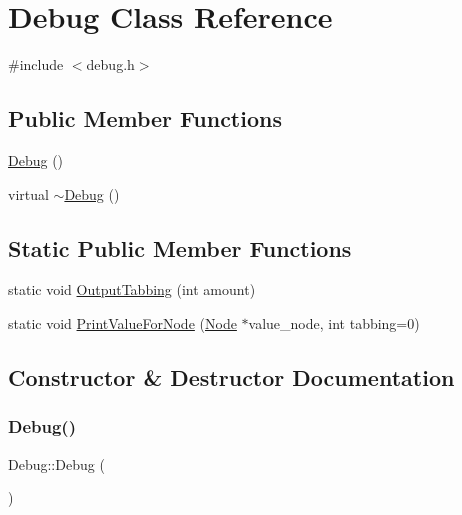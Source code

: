 \hypertarget{classDebug}{}\section{Debug Class Reference}
\label{classDebug}


{\ttfamily \#include $<$debug.\+h$>$}

\subsection*{Public Member Functions}
\begin{DoxyCompactItemize}
\item 
\hyperlink{classDebug_a5b453c195c4cfffed2702c3330f53a64}{Debug} ()
\item 
virtual \hyperlink{classDebug_a1effbd1502e249f80a3122b4bdfa7223}{$\sim$\+Debug} ()
\end{DoxyCompactItemize}
\subsection*{Static Public Member Functions}
\begin{DoxyCompactItemize}
\item 
static void \hyperlink{classDebug_ae57630ccc6a2e3807f698ed6fef69786}{Output\+Tabbing} (int amount)
\item 
static void \hyperlink{classDebug_a104d2378a5e251c0b4fb4fdb58802ead}{Print\+Value\+For\+Node} (\hyperlink{classNode}{Node} $\ast$value\+\_\+node, int tabbing=0)
\end{DoxyCompactItemize}


\subsection{Constructor \& Destructor Documentation}
\mbox{\label{classDebug_a5b453c195c4cfffed2702c3330f53a64}} 
\subsubsection{\texorpdfstring{Debug()}{Debug()}}
{\footnotesize\ttfamily Debug\+::\+Debug (\begin{DoxyParamCaption}{ }\end{DoxyParamCaption})}

\mbox{\label{classDebug_a1effbd1502e249f80a3122b4bdfa7223}} 
